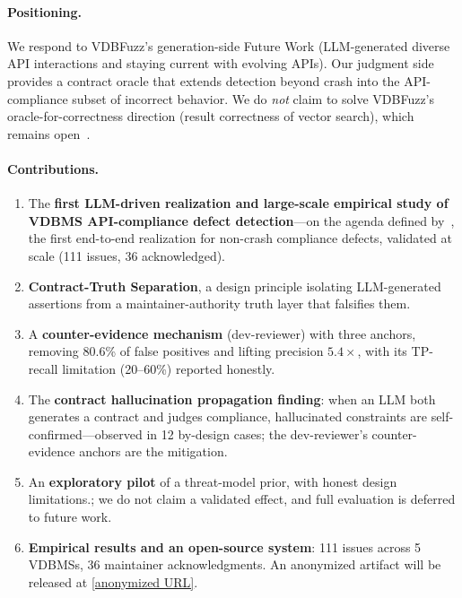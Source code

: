 \documentclass[sigconf, anonymous, review]{acmart}
\newcommand{\added}[1]{{\color{blue}#1}}
\begin{document}
\paragraph{Positioning.}
We respond to VDBFuzz's generation-side Future Work (LLM-generated diverse API interactions and staying current with evolving APIs). Our judgment side provides a contract oracle that extends detection beyond crash into the API-compliance subset of incorrect behavior. We do \emph{not} claim to solve VDBFuzz's oracle-for-correctness direction (result correctness of vector search), which remains open~\cite{roadmap25}.

\paragraph{Contributions.}
\begin{enumerate}[leftmargin=*,itemsep=2pt]
\item The \textbf{first LLM-driven realization and large-scale empirical study of VDBMS API-compliance defect detection}---on the agenda defined by~\cite{roadmap25}, the first end-to-end realization for non-crash compliance defects, validated at scale (111 issues, 36 acknowledged).
\item \textbf{Contract-Truth Separation}, a design principle isolating LLM-generated assertions from a maintainer-authority truth layer that falsifies them.
\item A \textbf{counter-evidence mechanism} (dev-reviewer) with three anchors, removing 80.6\% of false positives and lifting precision $5.4\times$, with its TP-recall limitation (20--60\%) reported honestly.
\item The \textbf{contract hallucination propagation finding}: when an LLM both generates a contract and judges compliance, hallucinated constraints are self-confirmed---observed in 12 by-design cases; the dev-reviewer's counter-evidence anchors are the mitigation.
\item An \textbf{exploratory pilot} of a threat-model prior, with honest design limitations.\added{; we do not claim a validated effect, and full evaluation is deferred to future work.}
\item \textbf{Empirical results and an open-source system}: 111 issues across 5 VDBMSs, 36 maintainer acknowledgments.\added{ An anonymized artifact will be released at \url{[anonymized URL]}.}
\end{enumerate}

\end{document}
